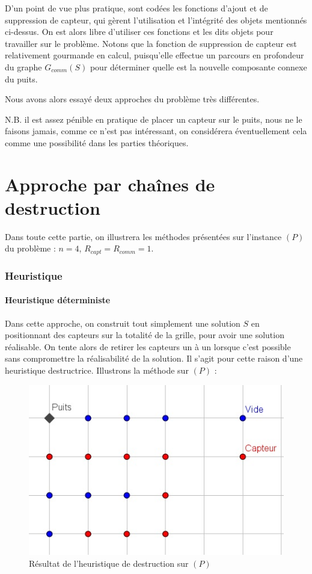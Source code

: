 \documentclass[12pt,a4paper]{article}
\begin{document}
D'un point de vue plus pratique, sont codées les fonctions d'ajout et de suppression de capteur, qui gèrent l'utilisation et l'intégrité des objets mentionnés ci-dessus. On est alors libre d'utiliser ces fonctions et les dits objets pour travailler sur le problème. Notons que la fonction de suppression de capteur est relativement gourmande en calcul, puisqu'elle effectue un parcours en profondeur du graphe $G_{comm}(S)$ pour déterminer quelle est la nouvelle composante connexe du puits.



Nous avons alors essayé deux approches du problème très différentes.

N.B. il est assez pénible en pratique de placer un capteur sur le puits, nous ne le faisons jamais, comme ce n'est pas intéressant, on considérera éventuellement cela comme une possibilité dans les parties théoriques.
\part{Approche par chaînes de destruction}
Dans toute cette partie, on illustrera les méthodes présentées sur l'instance $(P)$ du problème : $n=4$, $R_{capt}=R_{comm}=1$.
\section{Heuristique}
\subsection {Heuristique déterministe}
Dans cette approche, on construit tout simplement une solution $S$ en positionnant des capteurs sur la totalité de la grille, pour avoir une solution réalisable. On tente alors de retirer les capteurs un à un lorsque c'est possible sans compromettre la réalisabilité de la solution. Il s'agit pour cette raison d'une heuristique destructrice.
Illustrons la méthode sur $(P)$ : 
\begin{figure}[!h]
\center
\includegraphics[scale=1]{Images/4_1_1_naif.jpg}
\caption{Résultat de l'heuristique de destruction sur $(P)$}
\end{figure}
\end{document}
